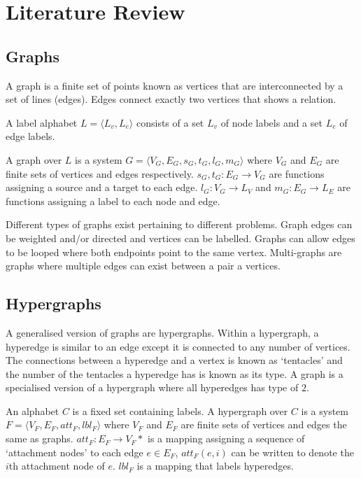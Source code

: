 \section{Literature Review}

\subsection{Graphs}
  

  A graph is a finite set of points known as vertices that are interconnected by a set of lines (edges). Edges connect exactly two vertices that shows a relation.

  A label alphabet $L = \langle L_v, L_e \rangle$ consists of a set $L_v$ of node labels and a set $L_e$ of edge labels.

  A graph over $L$ is a system $G = \langle V_G, E_G, s_G, t_G, l_G, m_G \rangle$ where $V_G$ and $E_G$ are finite sets of vertices and edges respectively. $s_G, t_G : E_G \to V_G$ are functions assigning a source and a target to each edge. $l_G : V_G \to L_V$ and $m_G : E_G \to L_E$ are functions assigning a label to each node and edge\cite{Detlef1}.

  Different types of graphs exist pertaining to different problems. Graph edges can be weighted and/or directed and vertices can be labelled. Graphs can allow edges to be looped where both endpoints point to the same vertex. Multi-graphs are graphs where multiple edges can exist between a pair a vertices.

\subsection{Hypergraphs}
  

  A generalised version of graphs are hypergraphs. Within a hypergraph, a hyperedge is similar to an edge except it is connected to any number of vertices. The connections between a hyperedge and a vertex is known as `tentacles' and the number of the tentacles a hyperedge has is known as its type. A graph is a specialised version of a hypergraph where all hyperedges has type of $2$.

  An alphabet $C$ is a fixed set containing labels. A hypergraph over $C$ is a system $F = \langle V_F, E_F, att_F, lbl_F \rangle$ where $V_F$ and $E_F$ are finite sets of vertices and edges the same as graphs. $att_F : E_F \to V_F*$ is a mapping assigning a sequence of `attachment nodes' to each edge $e \in E_F$, $att_F(e, i)$ can be written to denote the $i$th attachment node of $e$. $lbl_F$ is a mapping that labels hyperedges. 

